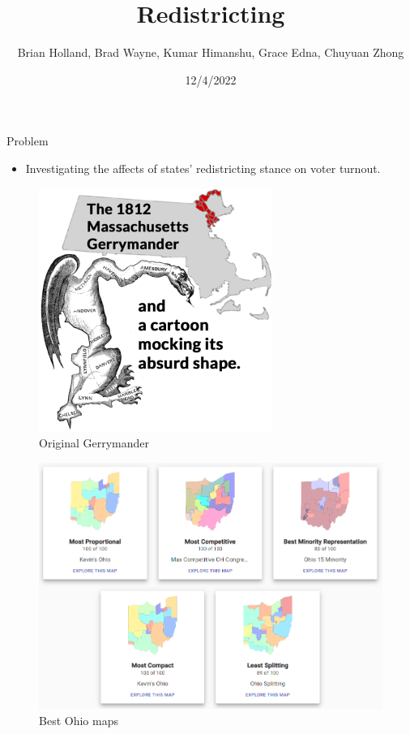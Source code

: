 \documentclass[
  ignorenonframetext,
]{beamer}
\title{Redistricting}
\author{Brian Holland, Brad Wayne, Kumar Himanshu, Grace Edna, Chuyuan
Zhong}
\date{12/4/2022}
\providecommand{\tightlist}{%
  \setlength{\itemsep}{0pt}\setlength{\parskip}{0pt}}
\begin{document}
\frame{\titlepage}

\begin{frame}{Problem}
\protect\hypertarget{problem}{}
\begin{itemize}
\tightlist
\item
  Investigating the affects of states' redistricting stance on voter
  turnout.
\end{itemize}

\begin{figure}
\centering
\includegraphics{images/GerryManderCartoonMap.png}
\caption{Original Gerrymander}
\end{figure}
\end{frame}

\begin{frame}{}
\protect\hypertarget{section}{}
\begin{figure}
\centering
\includegraphics{images/ohio_bests.png}
\caption{Best Ohio maps}
\end{figure}
\end{frame}
\end{document}
